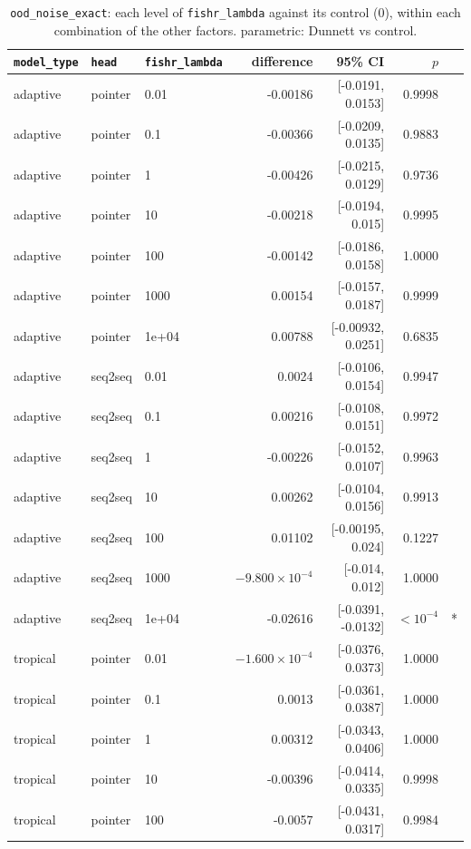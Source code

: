 \documentclass[10pt]{article}
\begin{document}
{\small
\begin{longtable}{lllrrrl}
\caption{\texttt{ood\_noise\_exact}: each level of \texttt{fishr\_lambda} against its control (0), within each combination of the other factors. parametric: Dunnett vs control.}\label{tab:control-ood_noise_exact}\\
\toprule
\texttt{model\_type} & \texttt{head} & \texttt{fishr\_lambda} & difference & 95\% CI & $p$ & \\
\midrule
\endhead
adaptive & pointer & 0.01 & -0.00186 & [-0.0191, 0.0153] & 0.9998 & \\
adaptive & pointer & 0.1 & -0.00366 & [-0.0209, 0.0135] & 0.9883 & \\
adaptive & pointer & 1 & -0.00426 & [-0.0215, 0.0129] & 0.9736 & \\
adaptive & pointer & 10 & -0.00218 & [-0.0194, 0.015] & 0.9995 & \\
adaptive & pointer & 100 & -0.00142 & [-0.0186, 0.0158] & 1.0000 & \\
adaptive & pointer & 1000 & 0.00154 & [-0.0157, 0.0187] & 0.9999 & \\
adaptive & pointer & 1e+04 & 0.00788 & [-0.00932, 0.0251] & 0.6835 & \\
adaptive & seq2seq & 0.01 & 0.0024 & [-0.0106, 0.0154] & 0.9947 & \\
adaptive & seq2seq & 0.1 & 0.00216 & [-0.0108, 0.0151] & 0.9972 & \\
adaptive & seq2seq & 1 & -0.00226 & [-0.0152, 0.0107] & 0.9963 & \\
adaptive & seq2seq & 10 & 0.00262 & [-0.0104, 0.0156] & 0.9913 & \\
adaptive & seq2seq & 100 & 0.01102 & [-0.00195, 0.024] & 0.1227 & \\
adaptive & seq2seq & 1000 & $-9.800\times10^{-4}$ & [-0.014, 0.012] & 1.0000 & \\
adaptive & seq2seq & 1e+04 & -0.02616 & [-0.0391, -0.0132] & $<10^{-4}$ & *\\
tropical & pointer & 0.01 & $-1.600\times10^{-4}$ & [-0.0376, 0.0373] & 1.0000 & \\
tropical & pointer & 0.1 & 0.0013 & [-0.0361, 0.0387] & 1.0000 & \\
tropical & pointer & 1 & 0.00312 & [-0.0343, 0.0406] & 1.0000 & \\
tropical & pointer & 10 & -0.00396 & [-0.0414, 0.0335] & 0.9998 & \\
tropical & pointer & 100 & -0.0057 & [-0.0431, 0.0317] & 0.9984 & \\

\end{longtable}}
\end{document}
